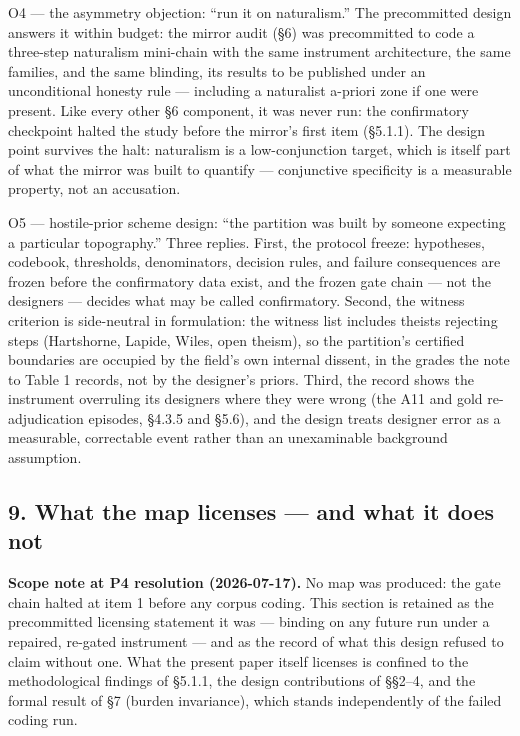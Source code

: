 O4 --- the asymmetry objection: ``run it on naturalism.'' The precommitted design answers it within budget: the mirror audit (\S{}6) was precommitted to code a three-step naturalism mini-chain with the same instrument architecture, the same families, and the same blinding, its results to be published under an unconditional honesty rule --- including a naturalist a-priori zone if one were present. Like every other \S{}6 component, it was never run: the confirmatory checkpoint halted the study before the mirror's first item (\S{}5.1.1). The design point survives the halt: naturalism is a low-conjunction target, which is itself part of what the mirror was built to quantify --- conjunctive specificity is a measurable property, not an accusation.

O5 --- hostile-prior scheme design: ``the partition was built by someone expecting a particular topography.'' Three replies. First, the protocol freeze: hypotheses, codebook, thresholds, denominators, decision rules, and failure consequences are frozen before the confirmatory data exist, and the frozen gate chain --- not the designers --- decides what may be called confirmatory. Second, the witness criterion is side-neutral in formulation: the witness list includes theists rejecting steps (Hartshorne, Lapide, Wiles, open theism), so the partition's certified boundaries are occupied by the field's own internal dissent, in the grades the note to Table 1 records, not by the designer's priors. Third, the record shows the instrument overruling its designers where they were wrong (the A11 and gold re-adjudication episodes, \S{}4.3.5 and \S{}5.6), and the design treats designer error as a measurable, correctable event rather than an unexaminable background assumption.

\subsection{9. What the map licenses --- and what it does not}\label{what-the-map-licenses-and-what-it-does-not}

\textbf{Scope note at P4 resolution (2026-07-17).} No map was produced: the gate chain halted at item 1 before any corpus coding. This section is retained as the precommitted licensing statement it was --- binding on any future run under a repaired, re-gated instrument --- and as the record of what this design refused to claim without one. What the present paper itself licenses is confined to the methodological findings of \S{}5.1.1, the design contributions of \S{}\S{}2--4, and the formal result of \S{}7 (burden invariance), which stands independently of the failed coding run.

